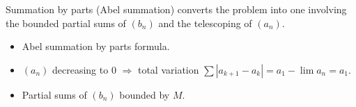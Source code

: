 \begin{remark*}
Summation by parts (Abel summation) converts the problem into one involving the bounded partial sums of $(b_n)$ and the telescoping of $(a_n)$.
\end{remark*}

\begin{remark*}[Dependencies]
\begin{itemize}
  \item Abel summation by parts formula.
  \item $(a_n)$ decreasing to 0 $\Rightarrow$ total variation $\sum |a_{k+1} - a_k| = a_1 - \lim a_n = a_1$.
  \item Partial sums of $(b_n)$ bounded by $M$.
\end{itemize}
\end{remark*}
